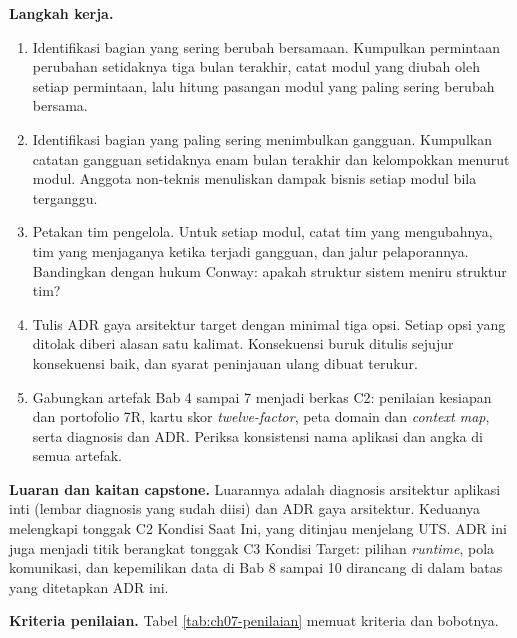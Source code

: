 \textbf{Langkah kerja.}
\begin{enumerate}
  \item Identifikasi bagian yang sering berubah bersamaan. Kumpulkan permintaan perubahan
        setidaknya tiga bulan terakhir, catat modul yang diubah oleh setiap permintaan, lalu
        hitung pasangan modul yang paling sering berubah bersama.
  \item Identifikasi bagian yang paling sering menimbulkan gangguan. Kumpulkan catatan gangguan
        setidaknya enam bulan terakhir dan kelompokkan menurut modul. Anggota non-teknis
        menuliskan dampak bisnis setiap modul bila terganggu.
  \item Petakan tim pengelola. Untuk setiap modul, catat tim yang mengubahnya, tim yang
        menjaganya ketika terjadi gangguan, dan jalur pelaporannya. Bandingkan dengan hukum
        Conway: apakah struktur sistem meniru struktur tim?
  \item Tulis ADR gaya arsitektur target dengan minimal tiga opsi. Setiap opsi yang ditolak diberi
        alasan satu kalimat. Konsekuensi buruk ditulis sejujur konsekuensi baik, dan syarat
        peninjauan ulang dibuat terukur.
  \item Gabungkan artefak Bab 4 sampai 7 menjadi berkas C2: penilaian kesiapan dan portofolio 7R,
        kartu skor \textit{twelve-factor}, peta domain dan \textit{context map}, serta diagnosis dan
        ADR. Periksa konsistensi nama aplikasi dan angka di semua artefak.
\end{enumerate}

\textbf{Luaran dan kaitan capstone.} Luarannya adalah diagnosis arsitektur aplikasi inti (lembar
diagnosis yang sudah diisi) dan ADR gaya arsitektur. Keduanya melengkapi tonggak C2 Kondisi Saat
Ini, yang ditinjau menjelang UTS. ADR ini juga menjadi titik berangkat tonggak C3 Kondisi Target:
pilihan \textit{runtime}, pola komunikasi, dan kepemilikan data di Bab 8 sampai 10 dirancang di
dalam batas yang ditetapkan ADR ini.

\textbf{Kriteria penilaian.} Tabel \ref{tab:ch07-penilaian} memuat kriteria dan bobotnya.

